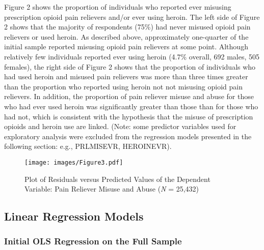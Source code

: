 \documentclass[sigconf]{acmart}
\begin{document}

Figure 2 shows the proportion of individuals who reported ever misusing 
prescription opioid pain relievers and/or ever using heroin. The left side 
of Figure 2 shows that the majority of respondents (75\%) had never misused 
opioid pain relievers or used heroin. As described above, approximately 
one-quarter of the initial sample reported misusing opioid pain relievers at 
some point. Although relatively few individuals reported ever using heroin 
(4.7\% overall, 692 males, 505 females), the right side of Figure 2 shows 
that the proportion of individuals who had used heroin and misused pain 
relievers was more than three times greater than the proportion who reported
using heroin not not misusing opioid pain relievers. In addition, the 
proportion of pain reliever misuse and abuse for those who had ever used 
heroin was significantly greater than those than for those who had not, 
which is consistent with the hypothesis that the misuse of prescription 
opioids and heroin use are linked. (Note: some predictor variables used for
exploratory analysis were excluded from the regression models presented in 
the following section: e.g., PRLMISEVR, HEROINEVR). 

\begin{figure}[!ht]
  \centering\texttt{[image: images/Figure3.pdf]}
  \caption{Plot of Residuals versus Predicted Values of the Dependent Variable: 
  Pain Reliever Misuse and Abuse (\textit{N} = 25,432)}
  \label{f:Figure3}
\end{figure}


\subsection{Linear Regression Models}

\subsubsection{Initial OLS Regression on the Full Sample} 
 
\end{document}
